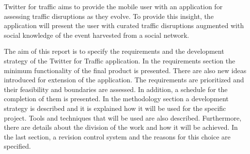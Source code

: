 Twitter for traffic aims to provide the mobile user with an application for assessing traffic disruptions as they evolve. To provide this insight, the application will present the user with curated traffic disruptions augmented with social knowledge of the event harvested from a social network.

The aim of this report is to specify the requirements and the development strategy of the Twitter for Traffic application. In the requirements section the minimum functionality of the final product is presented. There are also new ideas introduced for extension of the application. The requirements are prioritized and their feasibility and boundaries are assessed. In addition, a schedule for the completion of them is presented. In the methodology section a development strategy is described and it is explained how it will be used for the specific project. Tools and techniques that will be used are also described. Furthermore, there are details about the division of the work and how it will be achieved. In the last section, a revision control system and the reasons for this choice are specified.
